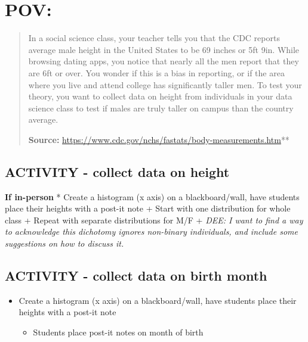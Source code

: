 \documentclass[
]{book}
\providecommand{\tightlist}{%
  \setlength{\itemsep}{0pt}\setlength{\parskip}{0pt}}
\begin{document}
\hypertarget{pov}{%
\section{POV:}\label{pov}}

\begin{quote}
In a social science class, your teacher tells you that the CDC
reports average male height in the United States to be 69
inches or 5ft 9in. While browsing dating apps, you notice that
nearly all the men report that they are 6ft or over. You wonder
if this is a bias in reporting, or if the area where you live
and attend college has significantly taller men. To test your
theory, you want to collect data on height from individuals in
your data science class to test if males are truly taller on campus
than the country average.

\textbf{Source:} \url{https://www.cdc.gov/nchs/fastats/body-measurements.htm}**
\end{quote}

\hypertarget{activity---collect-data-on-height}{%
\subsection{ACTIVITY - collect data on height}\label{activity---collect-data-on-height}}

\textbf{If in-person}
* Create a histogram (x axis) on a blackboard/wall, have students place their heights
with a post-it note
+ Start with one distribution for whole class
+ Repeat with separate distributions for M/F
+ \emph{DEE: I want to find a way to acknowledge this dichotomy ignores non-binary individuals, and include some suggestions on how to discuss it.}

\hypertarget{activity---collect-data-on-birth-month}{%
\subsection{ACTIVITY - collect data on birth month}\label{activity---collect-data-on-birth-month}}

\begin{itemize}
\tightlist
\item
  Create a histogram (x axis) on a blackboard/wall, have students place their heights
  with a post-it note

  \begin{itemize}
  \tightlist
  \item
    Students place post-it notes on month of birth
  \end{itemize}
\end{itemize}
\end{document}
